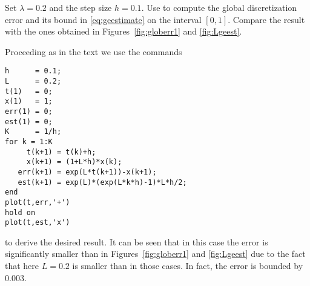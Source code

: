 \documentclass{ximera}
\begin{document}
\begin{exercise} \label{c15.3.3}
Set $\lambda=0.2$ and the step size $h=0.1$.  Use \Matlab to compute 
the global discretization error and its bound in \eqref{eq:geestimate}
on the interval $[0,1]$.  Compare the result with the ones obtained 
in Figures~\ref{fig:globerr1} and \ref{fig:Lgeest}.

\begin{solution}

Proceeding as in the text we use the \Matlab commands
\begin{verbatim}
h      = 0.1;
L      = 0.2;
t(1)   = 0;
x(1)   = 1;
err(1) = 0;
est(1) = 0;
K      = 1/h;
for k = 1:K
     t(k+1) = t(k)+h;
     x(k+1) = (1+L*h)*x(k);
   err(k+1) = exp(L*t(k+1))-x(k+1);
   est(k+1) = exp(L)*(exp(L*k*h)-1)*L*h/2;
end
plot(t,err,'+')
hold on
plot(t,est,'x')
\end{verbatim}
to derive the desired result.  It can be seen that in this case
the error is significantly smaller than in Figures~\ref{fig:globerr1}
and \ref{fig:Lgeest} due to the fact that here $L=0.2$ is smaller
than in those cases.  In fact, the error is bounded by $0.003$.





\end{solution}
\end{exercise}
\end{document}
